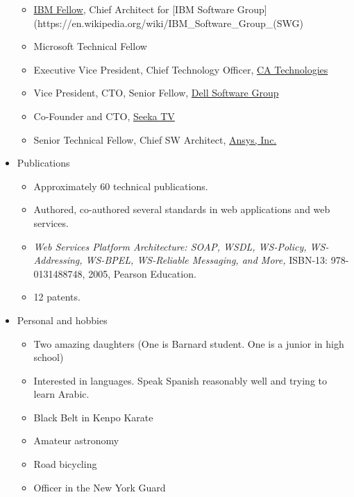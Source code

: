 \documentclass[11pt]{article}
\providecommand{\tightlist}{%
      \setlength{\itemsep}{0pt}\setlength{\parskip}{0pt}}
\begin{document}
\begin{itemize}
  \begin{itemize}
  \tightlist
  \item
    \href{https://en.wikipedia.org/wiki/IBM_Fellow}{IBM Fellow}, Chief
    Architect for {[}IBM Software
    Group{]}(https://en.wikipedia.org/wiki/IBM\_Software\_Group\_(SWG)
  \item
    Microsoft Technical Fellow
  \item
    Executive Vice President, Chief Technology Officer,
    \href{https://www.ca.com/us.html}{CA Technologies}
  \item
    Vice President, CTO, Senior Fellow,
    \href{https://en.wikipedia.org/wiki/Dell_Software}{Dell Software
    Group}
  \item
    Co-Founder and CTO, \href{https://seekatv.com/}{Seeka TV}
  \item
    Senior Technical Fellow, Chief SW Architect,
    \href{http://www.ansys.com}{Ansys, Inc.}
  \end{itemize}
\item
  Publications

  \begin{itemize}
  \tightlist
  \item
    Approximately 60 technical publications.
  \item
    Authored, co-authored several standards in web applications and web
    services.
  \item
    \emph{Web Services Platform Architecture: SOAP, WSDL, WS-Policy,
    WS-Addressing, WS-BPEL, WS-Reliable Messaging, and More,} ISBN-13:
    978-0131488748, 2005, Pearson Education.
  \item
    12 patents.
  \end{itemize}
\item
  Personal and hobbies

  \begin{itemize}
  \tightlist
  \item
    Two amazing daughters (One is Barnard student. One is a junior in
    high school)
  \item
    Interested in languages. Speak Spanish reasonably well and trying to
    learn Arabic.
  \item
    Black Belt in Kenpo Karate
  \item
    Amateur astronomy
  \item
    Road bicycling
  \item
    Officer in the New York Guard
  \end{itemize}
\end{itemize}
\end{document}
